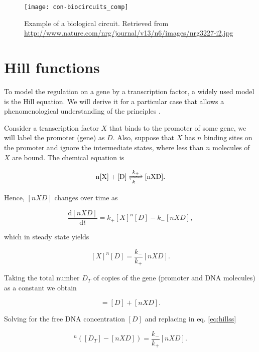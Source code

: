 \begin{figure}[H]
  \centering
  \texttt{[image: con-biocircuits\_comp]}
  \caption[Example of a biological circuit]{\label{fig:con-biocircuits_comp} Example of a biological circuit. Retrieved from \url{http://www.nature.com/nrg/journal/v13/n6/images/nrg3227-i2.jpg}}
\end{figure}

\section{Hill functions}
\label{sec:hill}

To model the regulation on a gene by a transcription factor, a widely used model is the Hill equation. We will derive it for a particular case that allows a phenomenological understanding of the principles \cite{alon06}.

Consider a transcription factor $X$ that binds to the promoter of some gene, we will label the promoter (gene) as $D$. Also, suppose that $X$ has $n$ binding sites on the promoter and ignore the intermediate states, where less than $n$ molecules of $X$ are bound. The chemical equation is

\begin{equation*}
  \ce{n[X] + [D]} \ce{<=>[k_+][k_-]} \ce{[nXD]}.
\end{equation*}

Hence, $[nXD]$ changes over time as

\begin{equation*}
  \frac{\mathrm{d}[nXD]}{\mathrm{d}t} = k_+[X]^n[D] - k_-[nXD],
\end{equation*}

which in steady state yields

\begin{equation}
  \label{eq:hillss}
  [X]^n[D] = \frac{k_-}{k_+}[nXD].
\end{equation}

Taking the total number $D_T$ of copies of the gene (promoter and DNA molecules) as a constant we obtain

\begin{equation*}
  [D_T] = [D]+[nXD].
\end{equation*}

Solving for the free DNA concentration $[D]$ and replacing in eq. \eqref{eq:hillss}

\begin{equation*}
  [X]^n\left([D_T]-[nXD]\right) = \frac{k_-}{k_+}[nXD].
\end{equation*}

